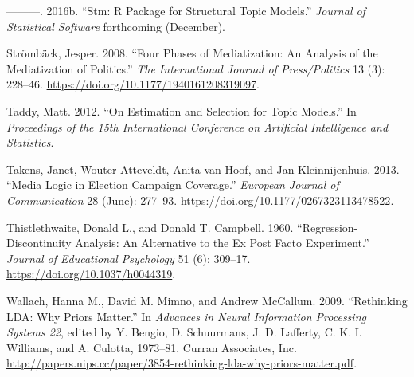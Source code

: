 \documentclass[
]{article}
\begin{document}
\leavevmode\hypertarget{ref-roberts_stm:_2016}{}%
---------. 2016b. ``Stm: R Package for Structural Topic Models.''
\emph{Journal of Statistical Software} forthcoming (December).

\leavevmode\hypertarget{ref-stromback_four_2008}{}%
Strömbäck, Jesper. 2008. ``Four Phases of Mediatization: An Analysis of
the Mediatization of Politics.'' \emph{The International Journal of
Press/Politics} 13 (3): 228--46.
\url{https://doi.org/10.1177/1940161208319097}.

\leavevmode\hypertarget{ref-taddy_estimation_2012}{}%
Taddy, Matt. 2012. ``On Estimation and Selection for Topic Models.'' In
\emph{Proceedings of the 15th International Conference on Artificial
Intelligence and Statistics}.

\leavevmode\hypertarget{ref-takens_media_2013}{}%
Takens, Janet, Wouter Atteveldt, Anita van Hoof, and Jan Kleinnijenhuis.
2013. ``Media Logic in Election Campaign Coverage.'' \emph{European
Journal of Communication} 28 (June): 277--93.
\url{https://doi.org/10.1177/0267323113478522}.

\leavevmode\hypertarget{ref-thistlethwaite_regression-discontinuity_1960}{}%
Thistlethwaite, Donald L., and Donald T. Campbell. 1960.
``Regression-Discontinuity Analysis: An Alternative to the Ex Post Facto
Experiment.'' \emph{Journal of Educational Psychology} 51 (6): 309--17.
\url{https://doi.org/10.1037/h0044319}.

\leavevmode\hypertarget{ref-wallach_rethinking_2009}{}%
Wallach, Hanna M., David M. Mimno, and Andrew McCallum. 2009.
``Rethinking LDA: Why Priors Matter.'' In \emph{Advances in Neural
Information Processing Systems 22}, edited by Y. Bengio, D. Schuurmans,
J. D. Lafferty, C. K. I. Williams, and A. Culotta, 1973--81. Curran
Associates, Inc.
\url{http://papers.nips.cc/paper/3854-rethinking-lda-why-priors-matter.pdf}.
\end{document}
